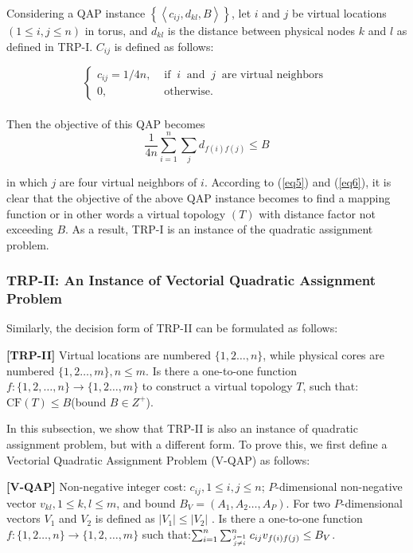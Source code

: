 Considering a QAP instance $\left\{\left\langle c_{i j}, d_{k l}, B\right\rangle\right\}$, let $i$ and $j$ be virtual locations $(1 \leq i, j \leq n)$ in torus, and $d_{k l}$ is the distance between physical nodes $k$ and $l$ as defined in TRP-I. $C_{i j}$ is defined as follows:

$$\left\{
    \begin{array}{ll}
        c_{i j}=1 / 4 n, & \text { if }\ i\ \text { and }\ j\ \text{ are\ virtual\ neighbors }\\
        0, & \text { otherwise.}
    \end{array} \right.
$$ \\

Then the objective of this QAP becomes
\begin{equation}
    \frac{1}{4 n} \sum_{i=1}^{n} \sum_{j} d_{f(i) f(j)} \leq B
    \label{eq6}
\end{equation}

in which $j$ are four virtual neighbors of $i$. According to (\ref{eq5}) and (\ref{eq6}), it is clear that the objective of the above QAP instance becomes to find a mapping function or in other words a virtual topology $(T)$ with distance factor not exceeding $B$. As a result, TRP-I is an instance of the quadratic assignment problem.

\subsubsection{TRP-II: An Instance of Vectorial Quadratic Assignment Problem}
Similarly, the decision form of TRP-II can be formulated as follows:

\textbf{[TRP-II]} Virtual locations are numbered $\{1,2 \ldots, n\}$, while physical cores are numbered $\{1,2 \ldots, m\}, n \leq m$. Is there a one-to-one function $f:\{1,2, \ldots, n\} \rightarrow\{1,2 \ldots, m\}$ to construct a virtual topology $T$, such that: $\mathrm{CF}(T) \leq B$(bound $B \in Z^{+}$).

In this subsection, we show that TRP-II is also an instance of quadratic assignment problem, but with a different form. To prove this, we first define a Vectorial Quadratic Assignment Problem (V-QAP) as follows:

\textbf{[V-QAP]} Non-negative integer cost: $c_{i j}, 1 \leq i, j \leq n$; $P$-dimensional non-negative vector $v_{k l}, 1 \leq k, l \leq m$, and bound $B_{V}=\left(A_{1}, A_{2} \ldots, A_{P}\right)$. For two    $P$-dimensional vectors $V_{1}$ and $V_{2}$ is defined as $\left|V_{1}\right| \leq\left|V_{2}\right|$   . Is there a one-to-one function $f:\{1,2 \ldots, n\} \rightarrow\{1,2, \ldots, m\}$ such that:$\sum_{i=1}^{n} \sum_{j=1 \atop j \neq i}^{n} c_{i j} v_{f(i) f(j)} \leq B_{V}$.

